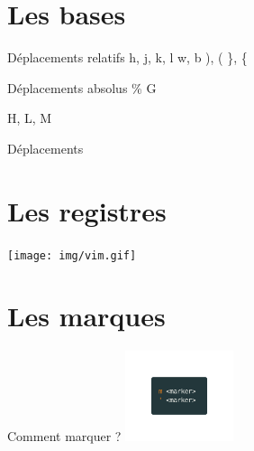 \documentclass[10pt]{beamer}
\begin{document}
		\section{Les bases}
			\begin{frame}{Déplacements relatifs}
				h, j, k, l
				w, b
				), (
				\}, \{

			\end{frame}

			\begin{frame}{Déplacements absolus}
				\%
				G

				H, L, M
			\end{frame}

			\begin{frame}{Déplacements}
			\end{frame}

		\section{Les registres}
			\begin{frame}{}
				\center
				\texttt{[image: img/vim.gif]}
			\end{frame}

		\section{Les marques}
			\begin{frame}{Comment marquer ?}
				\center
				\includegraphics[height=100]{img/markers.png}
			\end{frame}
\end{document}
